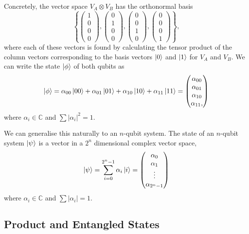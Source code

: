 \documentclass[11pt]{article}
\begin{document}
Concretely, the vector space $V_A \otimes V_B$ has the orthonormal basis
$$
\left\{\begin{pmatrix}
	1 \\ 0 \\ 0 \\ 0
\end{pmatrix},  \begin{pmatrix}
	0 \\ 1 \\ 0 \\ 0
\end{pmatrix},  \begin{pmatrix}
	0 \\ 0 \\ 1 \\ 0
\end{pmatrix},  \begin{pmatrix}
	0 \\ 0 \\ 0 \\ 1
\end{pmatrix} \right\},
$$
where each of these vectors is found by calculating the tensor product of the column vectors corresponding to the basis vectors $\ket{0}$ and $\ket{1}$ for {$V_A$} and {$V_B$}. We can write the state $\ket{\phi}$ of both qubits as
$$
\ket{\phi} = \alpha_{00} \ket{00} + \alpha_{01} \ket{01} +\alpha_{10} \ket{10} +\alpha_{11} \ket{11} = \begin{pmatrix}
	\alpha_{00}\\
	\alpha_{01}\\
	\alpha_{10}\\
	\alpha_{11},
\end{pmatrix}
$$
where $\alpha_i \in \mathbb{C}$ and $\sum |\alpha_i|^2 = 1$.


We can generalise this naturally to an $n$-qubit system. The state of an $n$-qubit system $\ket{\psi}$ is a vector in a $2^n$ dimensional complex vector space,
$$
\ket{\psi} = \sum_{i = 0}^{2^n - 1} \alpha_i \ket{i} = \begin{pmatrix}
	\alpha_0 \\
	\alpha_1 \\
	\vdots \\
	\alpha_{2^n - 1}
\end{pmatrix}
$$
where $\alpha_i \in \mathbb{C}$ and $\sum |\alpha_i| = 1$.


\subsection{Product and Entangled States}
\end{document}
